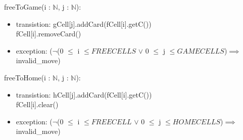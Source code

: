 \documentclass[12pt]{article}
\begin{document}
\noindent freeToGame(i : $\mathbb{N}$, j : $\mathbb{N}$):
\begin{itemize}
	\item transistion: gCell[j].addCard(fCell[i].getC())\\ fCell[i].removeCard()
	\item exception: ($\lnot$(0 $\le$ i $\le FREECELLS$ $\lor$ 0 $\le$ j $\le GAMECELLS$)$\implies$ invalid\_move)
\end{itemize}

\noindent freeToHome(i : $\mathbb{N}$, j : $\mathbb{N}$):
\begin{itemize}
	\item transistion: hCell[j].addCard(fCell[i].getC())\\ fCell[i].clear()
	\item exception: ($\lnot$(0 $\le$ i $\le FREECELL$ $\lor$ 0 $\le$ j $\le HOMECELLS$)$\implies$ invalid\_move)
\end{itemize}
\end{document}
